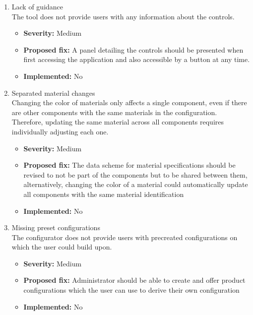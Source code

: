 \begin{enumerate}[label=\textbf{I\arabic*:}, leftmargin=*]
    \item Lack of guidance
        \vspace{2pt}
        \\The tool does not provide users with any information about the controls.
        \begin{itemize}[noitemsep, label=\trianglebullet]
            \item \textbf{Severity:} Medium
            \item \textbf{Proposed fix:} A panel detailing the controls should be presented when first accessing the application and also accessible by a button at any time.
            \item \textbf{Implemented:} No
        \end{itemize}
        \vspace{4pt}

    \item Separated material changes
        \vspace{2pt}
        \\Changing the color of materials only affects a single component, even if there are other components with the same materials in the configuration. Therefore, updating the same material across all components requires individually adjusting each one.
        \begin{itemize}[noitemsep, label=\trianglebullet]
            \item \textbf{Severity:} Medium
            \item \textbf{Proposed fix:} The data scheme for material specifications should be revised to not be part of the components but to be shared between them, alternatively, changing the color of a material could automatically update all components with the same material identification
            \item \textbf{Implemented:} No
        \end{itemize}
        \vspace{4pt}

    \item Missing preset configurations
        \vspace{2pt}
        \\The configurator does not provide users with precreated configurations on which the user could build upon.
        \begin{itemize}[noitemsep, label=\trianglebullet]
            \item \textbf{Severity:} Medium
            \item \textbf{Proposed fix:} Administrator should be able to create and offer product configurations which the user can use to derive their own configuration
            \item \textbf{Implemented:} No
        \end{itemize}
        \vspace{4pt}


\end{enumerate}
